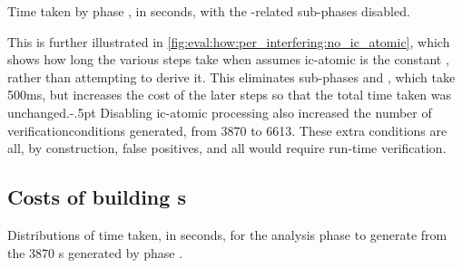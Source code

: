 \begin{sanefig}
  \caption{Time taken by phase \subinterfering{}, in seconds, with the
    -related sub-phases disabled.}
  \label{fig:eval:how:per_interfering:no_ic_atomic}
\end{sanefig}

This is further illustrated in
\autoref{fig:eval:how:per_interfering:no_ic_atomic}, which shows how
long the various steps take when {\implementation} assumes
\gls{ic-atomic} is the constant \true, rather than attempting to
derive it.  This eliminates sub-phases  and
, which take 500ms, but increases the cost of the
later steps so that the total time taken was
unchanged.\kern-.5pt
Disabling \gls{ic-atomic} processing also increased the number of
\glspl{verificationcondition} generated, from 3870 to 6613.  These
extra conditions are all, by construction, false positives, and all
would require run-time verification.

\subsection{Costs of building s}

\begin{sanefig}
  \caption{Distributions of time taken, in seconds, for the \subenf{}
    analysis phase to generate  from the
    3870 s generated by phase
    \subinterfering{}.}
  \label{fig:eval:how:build_enforcer}
\end{sanefig}

